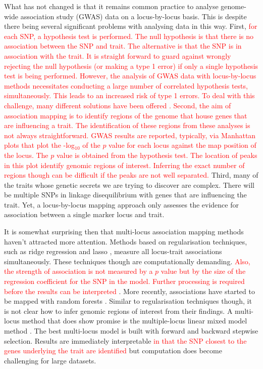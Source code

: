 \documentclass{bioinfo}
\begin{document}
What has not changed is that it remains common practice to analyse genome-wide association study (GWAS) data on a locus-by-locus basis. This is despite there being several significant problems with analysing data in this way. 
First, \textcolor{red}{ for each SNP, a hypothesis test is performed. The null hypothesis is that  there is no association between the SNP and trait. 
The alternative is that the SNP is in association with the trait. It is straight forward to guard against wrongly rejecting the null 
hypothesis (or making a type 1 error) if only a single hypothesis test is being performed. However, the analysis of GWAS data 
with locus-by-locus methods necessitates  conducting a large number of correlated hypothesis tests, simultaneously. 
 This leads to an increased risk of type 1 errors.  To deal with this challenge, many different solutions have been offered 
 \citep{storey2003statistical, li2005adjusting, de2005efficiency}.  Second, 
the aim of association mapping is to identify regions of the genome that house genes that are influencing a trait. 
The identification of these regions from these analyses is not always straightforward. GWAS results are reported, typically, via Manhattan plots 
that plot the -log$_{10}$ of the $p$ value for each locus against the map position of the locus. The $p$ value is obtained from the hypothesis test. 
The location of peaks in this plot identify genomic 
regions of interest. Inferring the exact number of regions though can be difficult if the peaks are not well separated. }
 Third, many of the traits whose genetic secrets we are trying to discover are complex. There will be multiple SNPs in linkage disequilibrium with genes that are influencing the trait. Yet, a locus-by-locus mapping approach only assesses the evidence for association between a single marker locus and trait.

It is somewhat surprising then that multi-locus association mapping methods haven't attracted more attention. Methods based on 
regularisation techniques, such as ridge regression \citep{shen2013novel}  and lasso \citep{rakitsch2013lasso}, measure all locus-trait associations simultaneously. These techniques though are computationally demanding. \textcolor{red}{Also, the strength of association is not measured by a $p$ value but by the size of the regression coefficient for the SNP in the model. Further processing is required before the results can be interpreted \citep{cho2010joint, rakitsch2013lasso}}.
More recently, associations have started to be mapped with random forests \citep{szymczak2016r2vim}. Similar to regularisation techniques though, it is not clear how to infer genomic regions of interest from their findings. A multi-locus method that does show promise is the multiple-locus linear mixed model method \citep{segura2012efficient}. The best multi-locus model is built with forward and backward stepwise selection. 
Results are immediately interpretable \textcolor{red}{in that the SNP closest to the genes underlying the trait are identified} 
but computation does become challenging for large datasets. 
\end{document}
